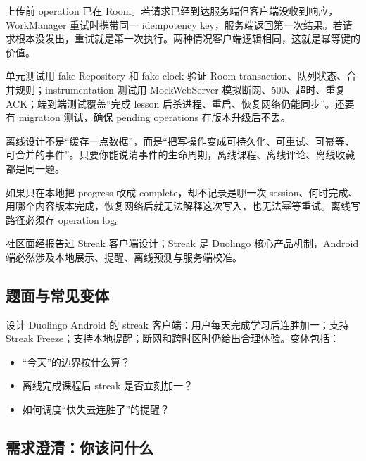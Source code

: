 \begin{followup}
上传前 operation 已在 Room。若请求已经到达服务端但客户端没收到响应，WorkManager 重试时携带同一 idempotency key，服务端返回第一次结果。若请求根本没发出，重试就是第一次执行。两种情况客户端逻辑相同，这就是幂等键的价值。
\end{followup}

\begin{followup}[“如何测试离线逻辑？”]
单元测试用 fake Repository 和 fake clock 验证 Room transaction、队列状态、合并规则；instrumentation 测试用 MockWebServer 模拟断网、500、超时、重复 ACK；端到端测试覆盖“完成 lesson 后杀进程、重启、恢复网络仍能同步”。还要有 migration 测试，确保 pending operations 在版本升级后不丢。
\end{followup}

\begin{idea}[可迁移心法]
离线设计不是“缓存一点数据”，而是“把写操作变成可持久化、可重试、可幂等、可合并的事件”。只要你能说清事件的生命周期，离线课程、离线评论、离线收藏都是同一题。
\end{idea}

\begin{pitfall}
如果只在本地把 progress 改成 complete，却不记录是哪一次 session、何时完成、用哪个内容版本完成，恢复网络后就无法解释这次写入，也无法幂等重试。离线写路径必须存 operation log。
\end{pitfall}


\srccommunity 社区面经报告过 Streak 客户端设计；\srcinferred Streak 是 Duolingo 核心产品机制，Android 端必然涉及本地展示、提醒、离线预测与服务端校准。

\subsection{题面与常见变体}

设计 Duolingo Android 的 streak 客户端：用户每天完成学习后连胜加一；支持 Streak Freeze；支持本地提醒；断网和跨时区时仍给出合理体验。变体包括：

\begin{itemize}
  \item “今天”的边界按什么算？
  \item 离线完成课程后 streak 是否立刻加一？
  \item 如何调度“快失去连胜了”的提醒？
\end{itemize}

\subsection{需求澄清：你该问什么}


